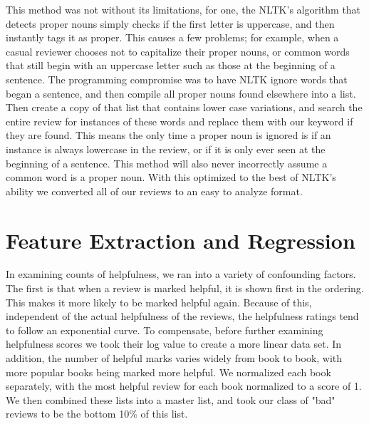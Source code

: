 \documentclass{article}
\begin{document}
\begin{multicols}{2}
This method was not without its limitations, for one, the NLTK’s algorithm that detects proper nouns simply checks if the first letter is uppercase, and then instantly tags it as proper. This causes a few problems; for example, when a casual reviewer chooses not to capitalize their proper nouns, or common words that still begin with an uppercase letter such as those at the beginning of a sentence. The programming compromise was to have NLTK ignore words that began a sentence, and then compile all proper nouns found elsewhere into a list. Then create a copy of that list that contains lower case variations, and search the entire review for instances of these words and replace them with our keyword if they are found. This means the only time a proper noun is ignored is if an instance is always lowercase in the review, or if it is only ever seen at the beginning of a sentence. This method will also never incorrectly assume a common word is a proper noun. With this optimized to the best of NLTK’s ability we converted all of our reviews to an easy to analyze format.
\newpage

\section{Feature Extraction and Regression}

In examining counts of helpfulness, we ran into a variety of confounding factors. The first is that when a review is marked helpful, it is shown first in the ordering. This makes it more likely to be marked helpful again. Because of this, independent of the actual helpfulness of the reviews, the helpfulness ratings tend to follow an exponential curve. To compensate, before further examining helpfulness scores we took their log value to create a more linear data set. In addition, the number of helpful marks varies widely from book to book, with more popular books being marked more helpful. We normalized each book separately, with the most helpful review for each book normalized to a score of 1. We then combined these lists into a master list, and took our class of "bad" reviews to be the bottom 10\% of this list.


\end{multicols}
\end{document}
